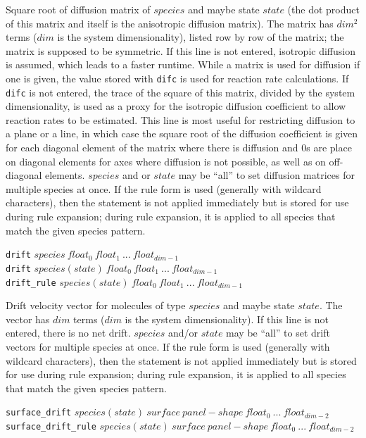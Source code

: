 \documentclass {book}
\newcommand {\ttt} {\texttt}
\begin{document}
\begin{description}
Square root of diffusion matrix of $species$ and maybe state $state$ (the dot product of this matrix and itself is the anisotropic diffusion matrix). The matrix has $dim^2$ terms ($dim$ is the system dimensionality), listed row by row of the matrix; the matrix is supposed to be symmetric. If this line is not entered, isotropic diffusion is assumed, which leads to a faster runtime. While a matrix is used for diffusion if one is given, the value stored with \ttt{difc} is used for reaction rate calculations. If \ttt{difc} is not entered, the trace of the square of this matrix, divided by the system dimensionality, is used as a proxy for the isotropic diffusion coefficient to allow reaction rates to be estimated. This line is most useful for restricting diffusion to a plane or a line, in which case the square root of the diffusion coefficient is given for each diagonal element of the matrix where there is diffusion and 0s are place on diagonal elements for axes where diffusion is not possible, as well as on off-diagonal elements. $species$ and or $state$ may be ``all'' to set diffusion matrices for multiple species at once. If the rule form is used (generally with wildcard characters), then the statement is not applied immediately but is stored for use during rule expansion; during rule expansion, it is applied to all species that match the given species pattern.

\item{\ttt{drift} $species\ float_0\ float_1\ ...\ float_{dim-1}$\\
\ttt{drift} $species(state)\ float_0\ float_1\ ...\ float_{dim-1}$\\
\ttt{drift\_rule} $species(state)\ float_0\ float_1\ ...\ float_{dim-1}$}

Drift velocity vector for molecules of type $species$ and maybe state $state$. The vector has $dim$ terms ($dim$ is the system dimensionality). If this line is not entered, there is no net drift. $species$ and/or $state$ may be ``all'' to set drift vectors for multiple species at once. If the rule form is used (generally with wildcard characters), then the statement is not applied immediately but is stored for use during rule expansion; during rule expansion, it is applied to all species that match the given species pattern.

\item{\ttt{surface\_drift} $species(state)\ surface\ panel-shape\ float_0\ ...\ float_{dim-2}$\\
\ttt{surface\_drift\_rule} $species(state)\ surface\ panel-shape\ float_0\ ...\ float_{dim-2}$}


\end{description}
\end{document}
